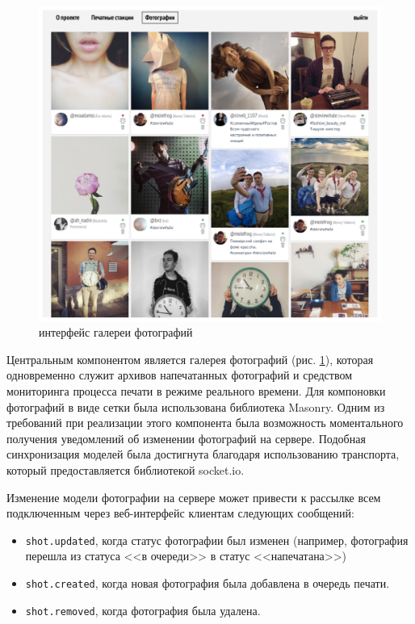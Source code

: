 \documentclass[a4paper,14pt,href]{article}
\begin{document}
\begin{figure}[htbp]
\begin{center}
  \includegraphics[scale=0.53]{grid-interface.pdf}
    \caption{интерфейс галереи фотографий}
    \label{fig:GridInterface}
\end{center}
\end{figure}

Центральным компонентом является галерея фотографий (рис. \ref{fig:GridInterface}), которая одновременно служит
архивов напечатанных фотографий и средством мониторинга процесса печати в режиме реального времени. Для компоновки
фотографий в виде сетки была использована библиотека Masonry\cite{Masonry}. Одним из требований при реализации
этого компонента была возможность моментального получения уведомлений об изменении фотографий на сервере.
Подобная синхронизация моделей была достигнута благодаря использованию транспорта, который предоставляется библиотекой
socket.io\cite{SocketIO}.

Изменение модели фотографии на сервере может привести к рассылке всем подключенным через веб-интерфейс клиентам
следующих сообщений:
\begin{itemize}
  \item \texttt{shot.updated}, когда статус фотографии был изменен (например, фотография перешла из статуса <<в очереди>>
  в статус <<напечатана>>)
  \item \texttt{shot.created}, когда новая фотография была добавлена в очередь печати.
  \item \texttt{shot.removed}, когда фотография была удалена.
\end{itemize}
\end{document}
